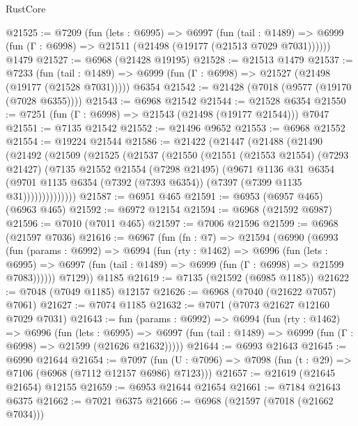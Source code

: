 \begin{lexlean}{RustCore}
\begin{coremodule}
@21525 := @7209
    (fun (lets : @6995) =>
    @6997
      (fun (tail : @1489) =>
      @6999 (fun (Γ : @6998) => @21511 (@21498 (@19177 (@21513 @7029 @7031))))))
    @1479
@21527 := @6968 (@21428 @19195)
@21528 := @21513 @1479
@21537 := @7233
    (fun (tail : @1489) => @6999 (fun (Γ : @6998) => @21527 (@21498 (@19177 (@21528 @7031)))))
    @6354
@21542 := @21428 (@7018 (@9577 (@19170 (@7028 @6355))))
@21543 := @6968 @21542
@21544 := @21528 @6354
@21550 := @7251 (fun (Γ : @6998) => @21543 (@21498 (@19177 @21544))) @7047
@21551 := @7135 @21542
@21552 := @21496 @9652
@21553 := @6968 @21552
@21554 := @19224 @21544
@21586 := @21422
    (@21447
      (@21488
        (@21490
          (@21492
            (@21509
              (@21525
                (@21537
                  (@21550
                    (@21551
                      (@21553 @21554)
                      (@7293 @21427)
                      (@7135
                        @21552
                        @21554
                        (@7298 @21495)
                        (@9671
                          @1136
                          @31
                          @6354
                          (@9701
                            @1135
                            @6354
                            (@7392 (@7393 @6354))
                            (@7397 (@7399 @1135 @31))))))))))))))
@21587 := @6951 @465
@21591 := @6953 (@6957 @465) (@6963 @465)
@21592 := @6972 @12154
@21594 := @6968 (@21592 @6987)
@21596 := @7010 (@7011 @465)
@21597 := @7006 @21596
@21599 := @6968 (@21597 @7036)
@21616 := @6967
    (fun (fn : @7) =>
    @21594
      (@6990
        (@6993
          (fun (params : @6992) =>
          @6994
            (fun (rty : @1462) =>
            @6996
              (fun (lets : @6995) =>
              @6997 (fun (tail : @1489) => @6999 (fun (Γ : @6998) => @21599 @7083))))))
        @7129))
    @1185
@21619 := @7135 (@21592 (@6985 @1185))
@21622 := @7048 (@7049 @1185) @12157
@21626 := @6968 (@7040 (@21622 @7057) @7061)
@21627 := @7074 @1185
@21632 := @7071 (@7073 @21627 @12160 @7029 @7031)
@21643 := fun (params : @6992) =>
  @6994
    (fun (rty : @1462) =>
    @6996
      (fun (lets : @6995) =>
      @6997 (fun (tail : @1489) => @6999 (fun (Γ : @6998) => @21599 (@21626 @21632)))))
@21644 := @6993 @21643
@21645 := @6990 @21644
@21654 := @7097
    (fun (U : @7096) => @7098 (fun (t : @29) => @7106 (@6968 (@7112 @12157 @6986) @7123)))
@21657 := @21619 (@21645 @21654) @12155
@21659 := @6953 @21644 @21654
@21661 := @7184 @21643 @6375
@21662 := @7021 @6375
@21666 := @6968 (@21597 (@7018 (@21662 @7034)))

\end{coremodule}
\end{lexlean}
